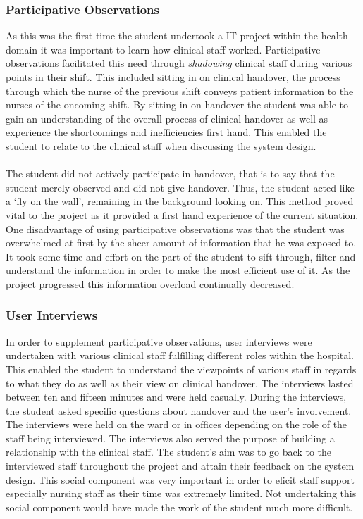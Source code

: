 \subsubsection{Participative Observations}
As this was the first time the student undertook a IT project within the health domain it was important to learn how clinical staff worked. Participative observations facilitated this need through \emph{shadowing} clinical staff during various points in their shift. This included sitting in on clinical handover, the process through which the nurse of the previous shift conveys patient information to the nurses of the oncoming shift. By sitting in on handover the student was able to gain an understanding of the overall process of clinical handover as well as experience the shortcomings and inefficiencies first hand. This enabled the student to relate to the clinical staff when discussing the system design. \\ \\
The student did not actively participate in handover, that is to say that the student merely observed and did not give handover. Thus, the student acted like a `fly on the wall', remaining in the background looking on. This method proved vital to the project as it provided a first hand experience of the current situation. One disadvantage of using participative observations was that the student was overwhelmed at first by the sheer amount of information that he was exposed to. It took some time and effort on the part of the student to sift through, filter and understand the information in order to make the most efficient use of it. As the project progressed this information overload continually decreased.

\subsubsection{User Interviews}
In order to supplement participative observations, user interviews were undertaken with various clinical staff fulfilling different roles within the hospital. This enabled the student to understand the viewpoints of various staff in regards to what they do as well as their view on clinical handover. The interviews lasted between ten and fifteen minutes and were held casually. During the interviews, the student asked specific questions about handover and the user's involvement. The interviews were held on the ward or in offices depending on the role of the staff being interviewed. The interviews also served the purpose of building a relationship with the clinical staff. The student's aim was to go back to the interviewed staff throughout the project and attain their feedback on the system design. This social component was very important in order to elicit staff support especially nursing staff as their time was extremely limited. Not undertaking this social component would have made the work of the student much more difficult.

